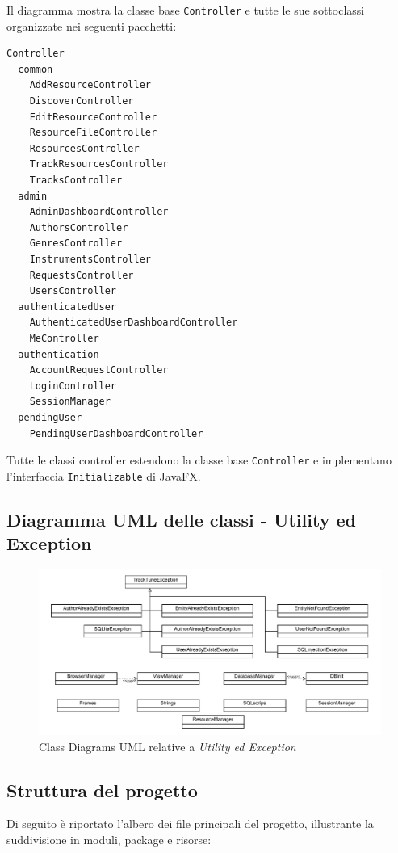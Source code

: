 \documentclass[a4paper]{article}
\begin{document}
Il diagramma mostra la classe base \texttt{Controller} e tutte le sue sottoclassi organizzate nei seguenti pacchetti:
\begin{lstlisting}[style=filetree]
Controller
  common
    AddResourceController
    DiscoverController
    EditResourceController
    ResourceFileController
    ResourcesController
    TrackResourcesController
    TracksController
  admin
    AdminDashboardController
    AuthorsController
    GenresController
    InstrumentsController
    RequestsController
    UsersController
  authenticatedUser
    AuthenticatedUserDashboardController
    MeController
  authentication
    AccountRequestController
    LoginController
    SessionManager
  pendingUser
    PendingUserDashboardController
\end{lstlisting}


Tutte le classi controller estendono la classe base \texttt{Controller} e implementano l'interfaccia \texttt{Initializable} di JavaFX.

\subsection{Diagramma UML delle classi - Utility ed Exception}
\begin{figure}[H]
    \centering
    \includegraphics[width=1.1 \textwidth]{./figures/uml_table_altri_package}
    \caption{Class Diagrams UML relative a \textit{Utility ed Exception}}
    \label{fig:uml_table_altri_package}
\end{figure}

\subsection{Struttura del progetto}

Di seguito è riportato l’albero dei file principali del progetto, illustrante la suddivisione in moduli, package e risorse:
\end{document}
